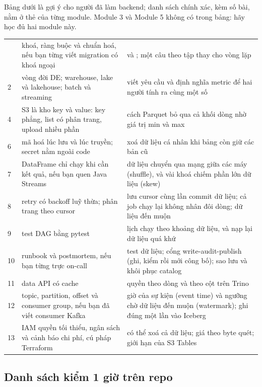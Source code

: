 Bảng dưới là gợi ý cho người đã làm backend; danh sách chính xác, kèm số bài, nằm ở thẻ của từng module. Module 3 và Module 5 không có trong bảng: hãy học đủ hai module này.
\begin{xltabular}{\textwidth}{@{}l L L@{}}
\toprule
{} &  &  \\
\midrule
\endhead
\bottomrule
{} & khoá, ràng buộc và chuẩn hoá, nếu bạn từng viết migration có khoá ngoại &  và ; một câu theo tập thay cho vòng lặp \\
2 & vòng đời DE; warehouse, lake và lakehouse; batch và streaming & viết yêu cầu và định nghĩa metric để hai người tính ra cùng một số \\
4 & S3 là kho key và value: key phẳng, list có phân trang, upload nhiều phần & cách Parquet bỏ qua cả khối dòng nhờ giá trị min và max \\
6 & mã hoá lúc lưu và lúc truyền; secret nằm ngoài code & xoá dữ liệu cá nhân khi bảng còn giữ các bản cũ \\
7 & DataFrame chỉ chạy khi cần kết quả, nếu bạn quen Java Streams & dữ liệu chuyển qua mạng giữa các máy (shuffle), và vài khoá chiếm phần lớn dữ liệu (skew) \\
8 & retry có backoff luỹ thừa; phân trang theo cursor & lưu cursor cùng lần commit dữ liệu; cả job chạy lại không nhân đôi dòng; dữ liệu đến muộn \\
9 & test DAG bằng pytest & lịch chạy theo khoảng dữ liệu, và nạp lại dữ liệu quá khứ \\
10 & runbook và postmortem, nếu bạn từng trực on-call & test dữ liệu; cổng write-audit-publish (ghi, kiểm rồi mới công bố); sao lưu và khôi phục catalog \\
11 & data API có cache & quyền theo dòng và theo cột trên Trino \\
12 & topic, partition, offset và consumer group, nếu bạn đã viết consumer Kafka & giờ của sự kiện (event time) và ngưỡng chờ dữ liệu đến muộn (watermark); ghi đúng một lần vào Iceberg \\
13 & IAM quyền tối thiểu, ngân sách và cảnh báo chi phí, cú pháp Terraform &  có thể xoá cả dữ liệu; giá theo byte quét; giới hạn của S3 Tables \\
\end{xltabular}

\subsection{Danh sách kiểm 1 giờ trên repo}

